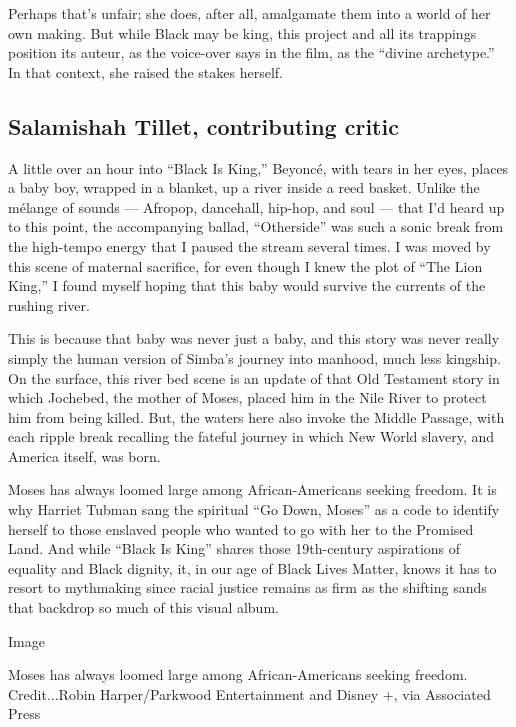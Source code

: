 Perhaps that's unfair; she does, after all, amalgamate them into a world
of her own making. But while Black may be king, this project and all its
trappings position its auteur, as the voice-over says in the film, as
the ``divine archetype.'' In that context, she raised the stakes
herself.

\hypertarget{salamishah-tillet-contributing-critic}{%
\subsection{Salamishah Tillet, contributing
critic}\label{salamishah-tillet-contributing-critic}}

A little over an hour into ``Black Is King,'' Beyoncé, with tears in her
eyes, places a baby boy, wrapped in a blanket, up a river inside a reed
basket. Unlike the mélange of sounds --- Afropop, dancehall, hip-hop,
and soul --- that I'd heard up to this point, the accompanying ballad,
``Otherside'' was such a sonic break from the high-tempo energy that I
paused the stream several times. I was moved by this scene of maternal
sacrifice, for even though I knew the plot of ``The Lion King,'' I found
myself hoping that this baby would survive the currents of the rushing
river.

This is because that baby was never just a baby, and this story was
never really simply the human version of Simba's journey into manhood,
much less kingship. On the surface, this river bed scene is an update of
that Old Testament story in which Jochebed, the mother of Moses, placed
him in the Nile River to protect him from being killed. But, the waters
here also invoke the Middle Passage, with each ripple break recalling
the fateful journey in which New World slavery, and America itself, was
born.

Moses has always loomed large among African-Americans seeking freedom.
It is why Harriet Tubman sang the spiritual ``Go Down, Moses'' as a code
to identify herself to those enslaved people who wanted to go with her
to the Promised Land. And while ``Black Is King'' shares those
19th-century aspirations of equality and Black dignity, it, in our age
of Black Lives Matter, knows it has to resort to mythmaking since racial
justice remains as firm as the shifting sands that backdrop so much of
this visual album.

Image

Moses has always loomed large among African-Americans seeking freedom.
Credit...Robin Harper/Parkwood Entertainment and Disney +, via
Associated Press

